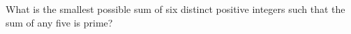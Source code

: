 What is the smallest possible sum of six distinct positive integers such that the sum of any five is prime?

